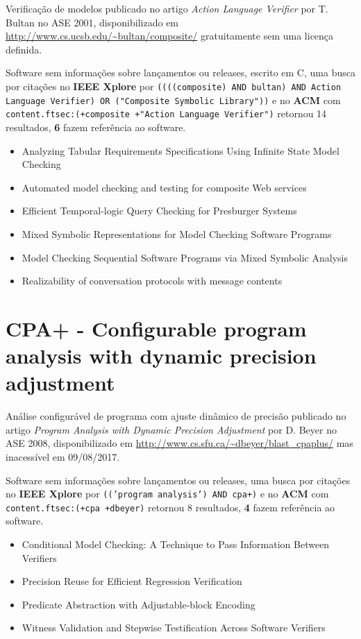 Verificação de modelos
publicado no artigo {\it Action Language Verifier}
por T. Bultan
no ASE 2001,
disponibilizado em \url{http://www.cs.ucsb.edu/~bultan/composite/}
gratuitamente
sem uma licença definida.

Software sem informações sobre lançamentos ou releases,
escrito em C,
uma busca por citações no {\bf IEEE Xplore} por
\texttt{((((composite) AND bultan) AND Action Language Verifier) OR ("Composite Symbolic Library"))}
e no {\bf ACM} com
\texttt{content.ftsec:(+composite +"Action Language Verifier")}
retornou
14 resultados,
{\bf 6} fazem referência ao software.

\begin{itemize}
\item Analyzing Tabular Requirements Specifications Using Infinite State Model Checking
\item Automated model checking and testing for composite Web services
\item Efficient Temporal-logic Query Checking for Presburger Systems
\item Mixed Symbolic Representations for Model Checking Software Programs
\item Model Checking Sequential Software Programs via Mixed Symbolic Analysis
\item Realizability of conversation protocols with message contents
\end{itemize}


\section{CPA+ - Configurable program analysis with dynamic precision adjustment}

Análise configurável de programa com ajuste dinâmico de precisão
publicado no artigo {\it Program Analysis with Dynamic Precision Adjustment}
por D. Beyer
no ASE 2008,
disponibilizado em \url{http://www.cs.sfu.ca/~dbeyer/blast_cpaplus/}
mas inacessível em 09/08/2017.

Software sem informações sobre lançamentos ou releases,
uma busca por citações no {\bf IEEE Xplore} por
\texttt{(('program analysis') AND cpa+)}
e no {\bf ACM} com
\texttt{content.ftsec:(+cpa +dbeyer)}
retornou
8 resultados,
{\bf 4} fazem referência ao software.

\begin{itemize}
\item Conditional Model Checking: A Technique to Pass Information Between Verifiers
\item Precision Reuse for Efficient Regression Verification
\item Predicate Abstraction with Adjustable-block Encoding
\item Witness Validation and Stepwise Testification Across Software Verifiers
\end{itemize}



